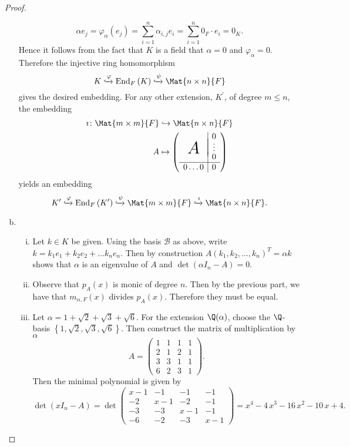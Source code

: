 \documentclass[10pt]{amsart}
\begin{document}
\begin{thm}
\begin{proof}
\begin{enumerate}[(a)]
$$\alpha e_j = \varphi_\alpha(e_j) = \sum_{i=1}^n \alpha_{i,j}e_i = \sum_{i=1}^n 0_F\cdot e_i = 0_K.$$
Hence it follows from the fact that $K$ is a field that $\alpha = 0$ and $\varphi_\alpha = 0$.
Therefore the injective ring homomorphism
$$K \xhookrightarrow{\varphi} \End{F}{K} \xhookrightarrow{\psi} \Mat{n \times n}{F}$$
gives the desired embedding.
For any other extension, $K^\prime$, of degree $m \leq n$, the embedding 
\begin{align*}
  \imath \colon \Mat{m\times m}{F} &\hookrightarrow \Mat{n \times n}{F}\\
  A &\mapsto 
  \left(\begin{array}{c|c}
    & 0\\
    \huge{\mbox{$A$}}\\[-5ex]
    &\vdots\\[-0.5ex]
    & 0\\
    \hline
    0 \ldots 0 & 0
  \end{array}\right)
\end{align*}
yields an embedding 
$$K^\prime \xhookrightarrow{\varphi} \End{F}{K^\prime} \xhookrightarrow{\psi} \Mat{m \times m}{F} \xhookrightarrow{\imath}\Mat{n \times n}{F}.$$
\item
  \begin{enumerate}[(i)]
  \item
    Let $k \in K$ be given.
    Using the basis $\mathcal{B}$ as above, write $k = k_1e_1 + k_2e_2 + \ldots k_ne_n$.
    Then by construction $A(k_1, k_2, \ldots, k_n)^T = \alpha k$ shows that $\alpha$ is an eigenvalue of $A$ and $\operatorname{det}(\alpha I_{n} - A) = 0$.
  \item
    Observe that $p_A(x)$ is monic of degree $n$.
    Then by the previous part, we have that $m_{\alpha,F}(x)$ divides $p_A(x)$.
    Therefore they must be equal.
  \item
    Let $\alpha = 1 + \sqrt{2} + \sqrt{3} + \sqrt{6}$.
    For the extension $\Q(\alpha)$, choose the $\Q$-basis $\left\{1, \sqrt{2}, \sqrt{3}, \sqrt{6}\right\}$.
    Then construct the matrix of multiplication by $\alpha$
    $$A = \left(\begin{array}{rrrr}
      1 & 1 & 1 & 1 \\
      2 & 1 & 2 & 1 \\
      3 & 3 & 1 & 1 \\
      6 & 2 & 3 & 1
    \end{array}\right).$$
    Then the minimal polynomial is given by
    $$\operatorname{det}(xI_n - A) = \operatorname{det}\left(\begin{array}{rrrr}
x - 1 & -1 & -1 & -1 \\
-2 & x - 1 & -2 & -1 \\
-3 & -3 & x - 1 & -1 \\
-6 & -2 & -3 & x - 1
\end{array}\right) = x^{4} - 4 \, x^{3} - 16 \, x^{2} - 10 \, x + 4
.$$
    

\end{enumerate}
\end{enumerate}
\end{proof}
\end{thm}
\end{document}
